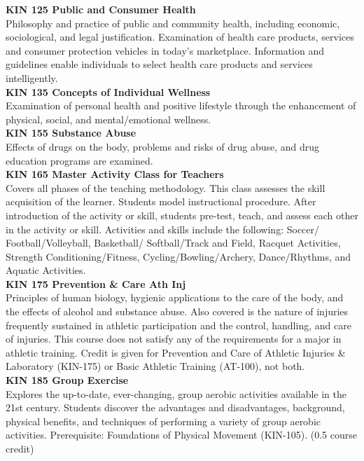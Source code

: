 \documentclass[
  letterpaper,
]{scrbook}
\begin{document}
\textbf{KIN 125 Public and Consumer Health}\\
Philosophy and practice of public and community health, including
economic, sociological, and legal justification. Examination of health
care products, services and consumer protection vehicles in today's
marketplace. Information and guidelines enable individuals to select
health care products and services intelligently.\\
\textbf{KIN 135 Concepts of Individual Wellness}\\
Examination of personal health and positive lifestyle through the
enhancement of physical, social, and mental/emotional wellness.\\
\textbf{KIN 155 Substance Abuse}\\
Effects of drugs on the body, problems and risks of drug abuse, and drug
education programs are examined.\\
\textbf{KIN 165 Master Activity Class for Teachers}\\
Covers all phases of the teaching methodology. This class assesses the
skill acquisition of the learner. Students model instructional
procedure. After introduction of the activity or skill, students
pre-test, teach, and assess each other in the activity or skill.
Activities and skills include the following: Soccer/
Football/Volleyball, Basketball/ Softball/Track and Field, Racquet
Activities, Strength Conditioning/Fitness, Cycling/Bowling/Archery,
Dance/Rhythms, and Aquatic Activities.\\
\textbf{KIN 175 Prevention \& Care Ath Inj}\\
Principles of human biology, hygienic applications to the care of the
body, and the effects of alcohol and substance abuse. Also covered is
the nature of injuries frequently sustained in athletic participation
and the control, handling, and care of injuries. This course does not
satisfy any of the requirements for a major in athletic training. Credit
is given for Prevention and Care of Athletic Injuries \& Laboratory
(KIN-175) or Basic Athletic Training (AT-100), not both.\\
\textbf{KIN 185 Group Exercise}\\
Explores the up-to-date, ever-changing, group aerobic activities
available in the 21st century. Students discover the advantages and
disadvantages, background, physical benefits, and techniques of
performing a variety of group aerobic activities. Prerequisite:
Foundations of Physical Movement (KIN-105). (0.5 course credit)\\
\end{document}
